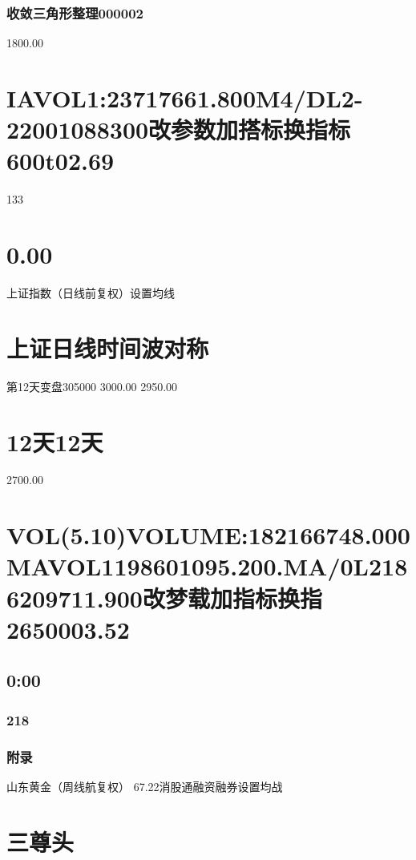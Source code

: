 \documentclass{article}
\begin{document}
\subsubsection{收敛三角形整理000002}

1800.00

\section{IAVOL1:23717661.800M4/DL2-22001088300改参数加搭标换指标600t02.69}

133

\section{0.00}

上证指数（日线前复权）设置均线

\section{上证日线时间波对称}

第12天变盘305000 3000.00 2950.00

\section{12天12天}

2700.00

\section{VOL(5.10)VOLUME:182166748.000MAVOL1198601095.200.MA/0L2186209711.900改梦载加指标换指2650003.52}

\subsection{0:00}

\subsubsection{218}

\clearpage

\subsubsection{附录}

山东黄金（周线航复权） 67.22消股通融资融券设置均战

\section{三尊头}
\end{document}
